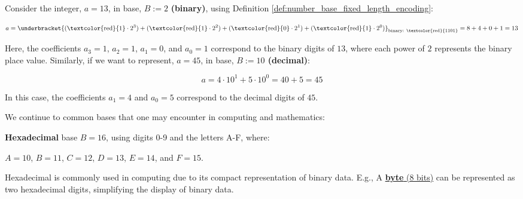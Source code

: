 \noindent
\begin{Example} 

Consider the integer, $a = 13$, in base, $B := 2$ \textbf{(binary)}, using Definition \ref{def:number_base_fixed_length_encoding}:

\Large
\[
a = \underbracket{(\text{\textcolor{red}{1}} \cdot 2^3) + (\text{\textcolor{red}{1}} \cdot 2^2) + (\text{\textcolor{red}{0}} \cdot 2^1) + (\text{\textcolor{red}{1}} \cdot 2^0)}_{\text{binary: \textcolor{red}{1101}}} = 8 + 4 + 0 + 1 = 13
\]
\normalsize

\vspace{1em}
\noindent
Here, the coefficients $a_3 = 1$, $a_2 = 1$, $a_1 = 0$, and $a_0 = 1$ correspond to the binary digits of $13$, where each 
power of $2$ represents the binary place value. Similarly, if we want to represent, $a = 45$, in base, \textbf{$B := 10$ (decimal)}:

\[
a = 4 \cdot 10^1 + 5 \cdot 10^0 = 40 + 5 = 45
\]

\noindent
In this case, the coefficients $a_1 = 4$ and $a_0 = 5$ correspond to the decimal digits of $45$.
\end{Example}

\noindent
We continue to common bases that one may encounter in computing and mathematics:
\begin{Def}[Hexadecimal]
    \textbf{Hexadecimal} base $B=16$, using digits 0-9 and the letters A-F, where:
    \begin{center}
        $A=10$, $B=11$, $C=12$, $D=13$, $E=14$, and $F=15$.
    \end{center} Hexadecimal is commonly used in computing due to its compact representation of binary data. E.g., 
    A \underline{\textbf{byte} (8 bits)} can be represented as two hexadecimal digits, simplifying the display of binary data.
\end{Def}

\newpage

